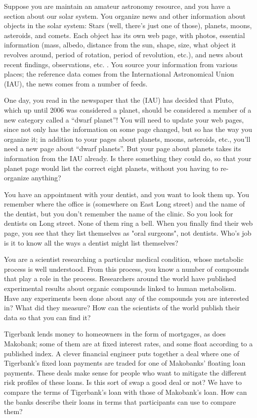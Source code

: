 Suppose you are maintain an amateur astronomy resource, and you have a section about our solar system. 
You organize news and other information about  objects in the solar system: Stars (well,
there's just one of those), planets, moons, asteroids, and comets. 
Each object has its own web page, with photos, 
essential information (mass, albedo, distance from the sun, shape, size,
what object it revolves around, period of rotation, period of
revolution, etc.), and news about recent findings, observations, etc. . 
You source your information from various places; the reference data comes from the 
International Astronomical
Union (IAU), the news comes from a number of feeds.  


One day, you read in the newspaper that the (IAU) has decided that Pluto, 
which up until 2006 was considered a
planet, should be considered a member of a new category called a ``dwarf
planet''!   You will need to update your web pages, since not only has the 
information on some page changed, but so has the way you organize it; in addition 
to your pages about planets, moons, asteroids, etc., you'll need a new page about 
``dwarf planets''.    But your page about planets takes its information from the 
IAU already.  Is there something they could do, so that your planet page would 
list the correct eight planets, without you having to re-organize anything? 

You have an appointment with your dentist, and you want to look them up.  You remember 
where the office is (somewhere on East Long street) and 
the name of the dentist, but you don't remember the name of the clinic.  So you look for dentists
on Long street.   None of them ring a bell.   When you finally find their web page, you 
see that they list themselves as "oral surgeons", not dentists.  Who's job is it to 
know all the ways a dentist might list themselves? 

You are a scientist researching a particular medical condition, whose metabolic process
is well understood.  From this process, you know a number of compounds that play a role
in the process.  Researchers around the world have published experimental results about
organic compounds linked to human metabolism.  Have any experiments been done about 
any of the compounds you are interested in?  What did they measure?  How can the scientists of 
the world publish their data so that you can find it? 

Tigerbank lends money to homeowners in the form of mortgages, as does Makobank; some of them
are at fixed interest rates, and some float according to a published index. A clever 
financial engineer puts together a deal where one of Tigerbank's fixed loan payments
are traded for one of Makobanks' floating loan payments.  These deals make sense for people who 
want to mitigate the different risk profiles of these loans.  Is this sort of swap a good 
deal or not?   We have to compare the terms of Tigerbank's loan with those of Makobank's loan.  
How can the banks describe their loans in terms that participants can use to compare them?


